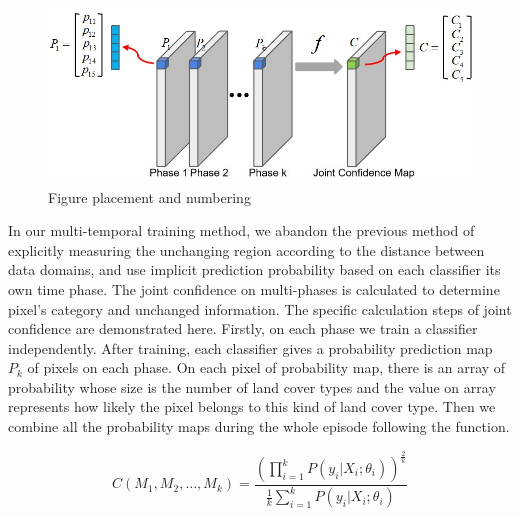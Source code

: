 \documentclass{isprs} %
\begin{document}
\begin{figure}[ht!]
	\begin{center}
			\includegraphics[width=1.0\columnwidth]{figures/images/jointConf.jpg}
		\caption{Figure placement and numbering}
	\label{fig:figure_placement}
	\end{center}
\end{figure}
In our multi-temporal training method, we abandon the previous method of explicitly measuring the unchanging region according to the distance between data domains, and use implicit prediction probability based on each classifier its own time phase. The joint confidence on multi-phases is calculated to determine pixel's category and unchanged information. The specific calculation steps of joint confidence are demonstrated here. Firstly, on each phase we train a classifier independently. After training, each classifier gives a probability prediction map $P_k$ of pixels on each phase. On each pixel of probability map, there is an array of probability whose size is the number of land cover types and the value on array represents how likely the pixel belongs to this kind of land cover type. Then we combine all the probability maps during the whole episode following the function.

\begin{equation}
    C(M_1,M_2,\dots,M_k)=\frac{(\prod\limits_{i=1}^{k}P(y_i|X_i;\theta_i))^{\frac{2}{k}}}{\frac{1}{k}\sum\limits_{i=1}^{k}P(y_i|X_i;\theta_i)}
\label{equ:conf}
\end{equation}
\end{document}
